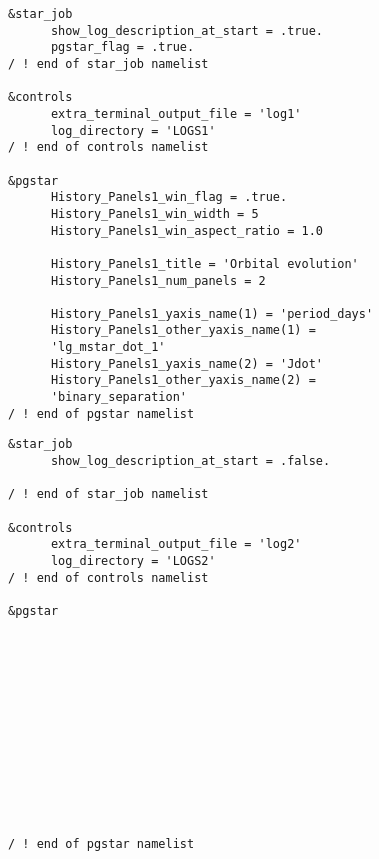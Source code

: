 \begin{landscape}
\begin{multicols}{2}
\begin{lstlisting}[caption=inlist1 \label{code:inlist1}]
&star_job
      show_log_description_at_start = .true.
      pgstar_flag = .true.
/ ! end of star_job namelist

&controls
      extra_terminal_output_file = 'log1' 
      log_directory = 'LOGS1'
/ ! end of controls namelist

&pgstar
      History_Panels1_win_flag = .true.
      History_Panels1_win_width = 5
      History_Panels1_win_aspect_ratio = 1.0 
      
      History_Panels1_title = 'Orbital evolution'
      History_Panels1_num_panels = 2
      
      History_Panels1_yaxis_name(1) = 'period_days'
      History_Panels1_other_yaxis_name(1) = 
      'lg_mstar_dot_1' 
      History_Panels1_yaxis_name(2) = 'Jdot' 
      History_Panels1_other_yaxis_name(2) = 
      'binary_separation' 
/ ! end of pgstar namelist

\end{lstlisting}
\begin{lstlisting}[caption=inlist2 \label{code:inlist2}]
&star_job
      show_log_description_at_start = .false.

/ ! end of star_job namelist

&controls
      extra_terminal_output_file = 'log2' 
      log_directory = 'LOGS2'
/ ! end of controls namelist

&pgstar













/ ! end of pgstar namelist
\end{lstlisting}
\end{multicols}
\end{landscape}


